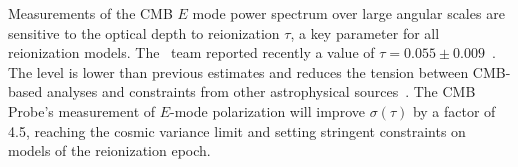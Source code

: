 Measurements of the \ac{CMB} $E$ mode power spectrum over large angular scales are sensitive to the optical depth 
to reionization $\tau$, a key parameter for all reionization models. 
The \planck\ team  reported recently a value of $\tau=0.055 \pm 0.009$~\cite{planck2016_xlvi,planck2016_xxxi}.
The level is lower than previous estimates and reduces the tension between CMB-based analyses and constraints from 
other astrophysical sources~\cite{Robertson:2015uda}.  
The CMB Probe's measurement of $E$-mode polarization will 
improve $\sigma(\tau)$ by a factor of 4.5, reaching the cosmic 
variance limit and setting stringent constraints on models of the reionization epoch. 



